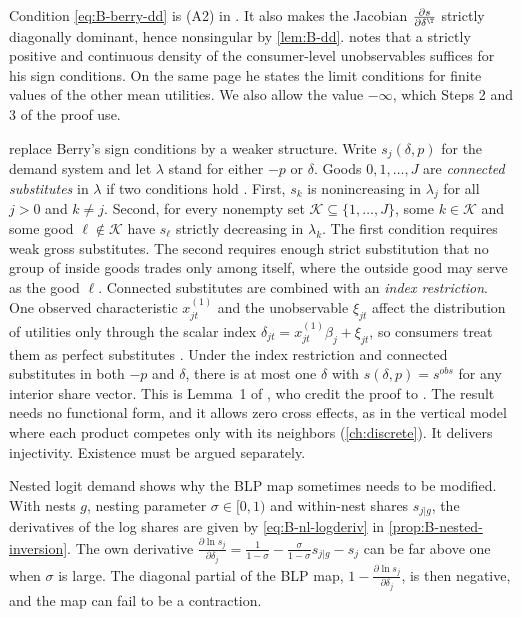 Condition \eqref{eq:B-berry-dd} is (A2) in \citet[p.~261]{Berry1994}. It also makes the Jacobian
$\frac{\partial s}{\partial\delta^\T}$ strictly diagonally dominant, hence nonsingular by \cref{lem:B-dd}.
 notes that a strictly positive and continuous density of the consumer-level
unobservables suffices for his sign conditions. On the same page he states the limit conditions for finite
values of the other mean utilities. We also allow the value $-\infty$, which Steps 2 and 3 of the proof use.

\begin{remark}\label{rem:B-connected-substitutes}
\citet{BerryGandhiHaile2013} replace Berry's sign conditions by a weaker structure. Write $s_j(\delta, p)$
for the demand system and let $\lambda$ stand for either $-p$ or $\delta$. Goods $0, 1, \dots, J$ are
\emph{connected substitutes} in $\lambda$ if two conditions hold \citep[Definition~1,
p.~1759]{BerryHaile2014}. First, $s_k$ is nonincreasing in $\lambda_j$ for all $j > 0$ and $k \neq j$. Second,
for every nonempty set $\mathcal{K} \subseteq \{1, \dots, J\}$, some $k \in \mathcal{K}$ and some good $\ell
\notin \mathcal{K}$ have $s_\ell$ strictly decreasing in $\lambda_k$. The first condition requires weak gross
substitutes. The second requires enough strict substitution that no group of inside goods trades only among
itself, where the outside good may serve as the good $\ell$. Connected substitutes are combined with an
\emph{index restriction}. One observed characteristic $x^{(1)}_{jt}$ and the unobservable $\xi_{jt}$ affect the
distribution of utilities only through the scalar index $\delta_{jt} = x^{(1)}_{jt}\beta_j + \xi_{jt}$, so
consumers treat them as perfect substitutes \citep[Section~3.2, eq.~(2) and Assumption~1, p.~1757]{BerryHaile2014}.
Under the index restriction and connected substitutes in both $-p$ and $\delta$, there is at most one $\delta$
with $s(\delta, p) = s^{obs}$ for any interior share vector. This is Lemma~1 of \citet[p.~1760]{BerryHaile2014},
who credit the proof to \citet{BerryGandhiHaile2013}. The result needs no functional form, and it allows zero
cross effects, as in the vertical model where each product competes only with its neighbors (\cref{ch:discrete}).
It delivers injectivity. Existence must be argued separately.
\end{remark}

Nested logit demand shows why the BLP map sometimes needs to be modified. With nests $g$, nesting parameter
$\sigma \in [0, 1)$ and within-nest shares $s_{j|g}$, the derivatives of the log shares are given by
\eqref{eq:B-nl-logderiv} in \cref{prop:B-nested-inversion}. The own derivative
$\frac{\partial\ln s_j}{\partial\delta_j} = \frac{1}{1-\sigma} - \frac{\sigma}{1-\sigma}s_{j|g} - s_j$ can be far above one when
$\sigma$ is large. The diagonal partial of the BLP map, $1 -
\frac{\partial\ln s_j}{\partial\delta_j}$, is then negative, and the map can fail to be a contraction.

